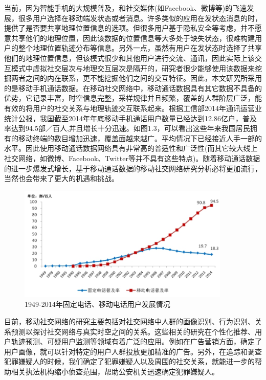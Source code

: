 当前，因为智能手机的大规模普及，和社交媒体(如Facebook、微博等)的飞速发展，很多用户选择在移动端发状态或者消息。许多类似的应用在发状态消息的时，提供了是否要共享地理位置信息的选项。但很多用户基于隐私安全等考虑，并不愿意共享他们的地理位置，因此该数据的位置信息等大多处于缺失状态，很难构建用户的整个地理位置轨迹分布等信息。另外一点，虽然有用户在发状态时选择了共享他们的地理位置信息，但该模式很少和其他用户进行交流、通讯，因此实际上该交互模式中虚拟社交层次与地理交互层次是隔开的，研究者很少能够使用该数据来挖掘两者之间的内在联系，更不能挖掘他们之间的交互特征。因此，本文研究所采用的是移动手机通话数据。在移动社交网络中，移动通话数据具有其它数据不具备的优势，它记录丰富，时空信息完整，采样规律并且频繁，覆盖的人群阶层广泛，能有效的将用户的社交关系与地理轨迹交互联系起来。根据工信部2014年通讯运营业统计公报，我国截至2014年年底移动手机通话用户数量已经达到12.86亿户，普及率达到94.5部／百人,并且增长十分迅速。如图1.3，可以看出这些年来我国居民拥有的移动终端的数目增加迅速，覆盖面越来越广。平均情况下已经接近人手一部的水平。因此使用移动通话数据网络具有非常高的普适性和广泛性(而其它较大线上社交网络，如微博、Facebook、Twitter等并不具有这些特点)。随着移动通话数据的进一步爆发式增长，基于移动通话数据的移动社交网络研究分析必将更加流行，当然也会带来了更大的机遇和挑战。


\begin{figure}[!ht]
	\centering
	\includegraphics[scale=1,width=0.9\textwidth]{figure/mobileinc.png}
	\caption{1949-2014年固定电话、移动电话用户发展情况}
	\label{fig-mobileinc}
\end{figure}


目前，移动社交网络的研究主要包括对社交网络中人群的画像识别、行为识别、关系预测以探讨社交网络与真实时空之间的关系。这些相关的研究在个性化推荐、用户轨迹预测、可疑用户监测等领域有着广泛的应用。例如在广告营销方面，确定了用户画像，就可以针对特定的用户人群投放更加精准的广告。另外，在追踪和调查犯罪嫌疑人的时候，我们确定了犯罪嫌疑人以及周围的社交关系，就能进一步的帮助相关执法机构缩小侦查范围，帮助公安机关迅速确定犯罪嫌疑人。

